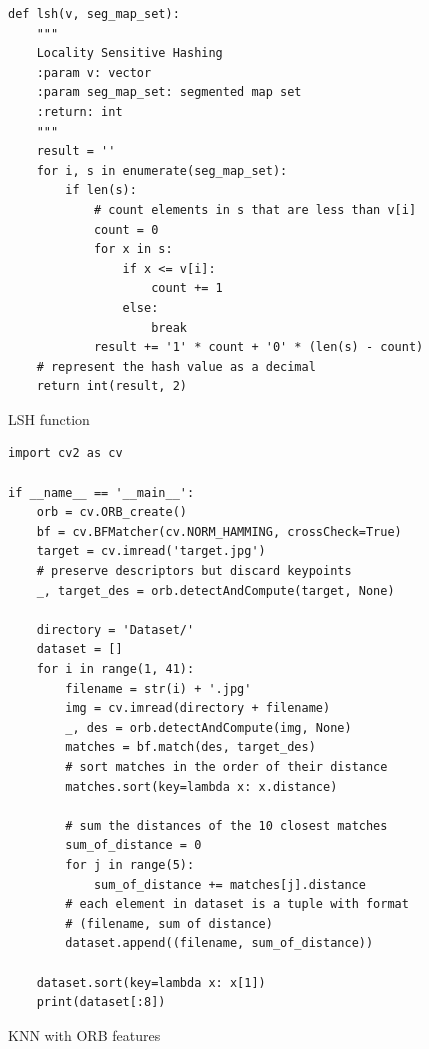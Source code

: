 \documentclass{ee208report}
\begin{document}
\begin{listing}
    \begin{verbatim}
def lsh(v, seg_map_set):
    """
    Locality Sensitive Hashing
    :param v: vector
    :param seg_map_set: segmented map set
    :return: int
    """
    result = ''
    for i, s in enumerate(seg_map_set):
        if len(s):
            # count elements in s that are less than v[i]
            count = 0
            for x in s:
                if x <= v[i]:
                    count += 1
                else:
                    break
            result += '1' * count + '0' * (len(s) - count)
    # represent the hash value as a decimal
    return int(result, 2)
    \end{verbatim}
    \caption{LSH function}
    \label{lst:lsh}
\end{listing}

\begin{listing}
    \begin{verbatim}
import cv2 as cv

if __name__ == '__main__':
    orb = cv.ORB_create()
    bf = cv.BFMatcher(cv.NORM_HAMMING, crossCheck=True)
    target = cv.imread('target.jpg')
    # preserve descriptors but discard keypoints
    _, target_des = orb.detectAndCompute(target, None)
    
    directory = 'Dataset/'
    dataset = []
    for i in range(1, 41):
        filename = str(i) + '.jpg'
        img = cv.imread(directory + filename)
        _, des = orb.detectAndCompute(img, None)
        matches = bf.match(des, target_des)
        # sort matches in the order of their distance
        matches.sort(key=lambda x: x.distance)
        
        # sum the distances of the 10 closest matches
        sum_of_distance = 0
        for j in range(5):
            sum_of_distance += matches[j].distance
        # each element in dataset is a tuple with format
        # (filename, sum of distance)
        dataset.append((filename, sum_of_distance))
    
    dataset.sort(key=lambda x: x[1])
    print(dataset[:8])
    \end{verbatim}
    \caption{KNN with ORB features}
    \label{lst:knn}
\end{listing}
\end{document}
